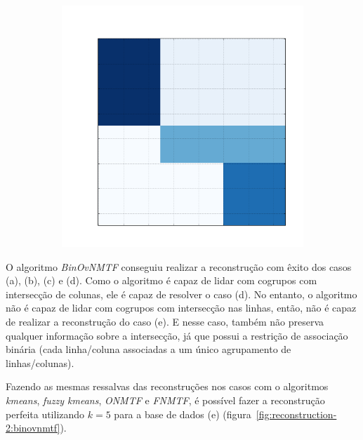 \documentclass[
    12pt,                %
    oneside,            %
    a4paper,            %
    english,            %
    brazil                %
    ]{abntex2ppgsi}
\begin{document}
\begin{figure}[H]
\begin{subfigure}[b]{0.18\textwidth}
        \caption{}
    \end{subfigure}
    \begin{subfigure}[b]{0.18\textwidth}
        \includegraphics[width=\textwidth]{img/e-reconstruction-binovnmtf.png}
        \caption{}
    \end{subfigure}
    \label{fig:reconstruction:binovnmtf}
\end{figure}

O algoritmo \textit{BinOvNMTF} conseguiu realizar a reconstrução com êxito dos casos (a), (b), (c) e (d).
Como o algoritmo é capaz de lidar com cogrupos com intersecção de colunas, ele é capaz de resolver o caso (d).
No entanto, o algoritmo não é capaz de lidar com cogrupos com intersecção nas linhas, então, não é capaz de realizar a reconstrução do caso (e).
E nesse caso, também não preserva qualquer informação sobre a intersecção, já que possui a restrição de associação binária (cada linha/coluna associadas a um único agrupamento de linhas/colunas).

Fazendo as mesmas ressalvas das reconstruções nos casos com o algoritmos \textit{kmeans}, \textit{fuzzy kmeans}, \textit{ONMTF} e \textit{FNMTF}, é possível fazer a reconstrução perfeita utilizando $k = 5$ para a base de dados (e) (figura~\ref{fig:reconstruction-2:binovnmtf}).
\end{document}
